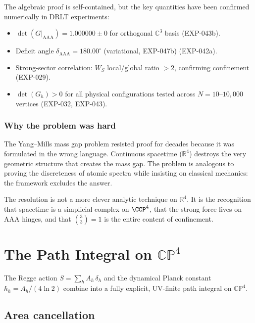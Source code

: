 \documentclass[12pt]{article}
\theoremstyle{remark}
\theoremstyle{definition}
\newcommand{\CC}{\mathbb{C}}
\newcommand{\RR}{\mathbb{R}}
\begin{document}
The algebraic proof is self-contained, but the key quantities have been
confirmed numerically in DRLT experiments:

\begin{itemize}
\item $\det(G|_{\mathrm{AAA}}) = 1.000000 \pm 0$ for orthogonal
  $\CC^3$ basis (EXP-043b).
\item Deficit angle $\delta_{\mathrm{AAA}} = 180.00^\circ$ (variational, EXP-047b)
  (EXP-042a).
\item Strong-sector correlation: $W_S$ local/global ratio $> 2$,
  confirming confinement (EXP-029).
\item $\det(G_h) > 0$ for all physical configurations tested across
  $N = 10$--$10{,}000$ vertices (EXP-032, EXP-043).
\end{itemize}

\subsubsection{Why the problem was hard}

The Yang--Mills mass gap problem resisted proof for decades because it
was formulated in the wrong language. Continuous spacetime
($\RR^4$) destroys the very geometric structure that creates the
mass gap. The problem is analogous to proving the discreteness of atomic
spectra while insisting on classical mechanics: the framework excludes
the answer.

The resolution is not a more clever analytic technique on $\RR^4$.
It is the recognition that spacetime is a simplicial complex on
$\CCP^4$, that the strong force lives on AAA hinges, and that
$\binom{3}{3} = 1$ is the entire content of confinement.

\section{The Path Integral on $\mathbb{CP}^4$}
\label{app:path_integral}

The Regge action $S = \sum_h A_h\,\delta_h$ and the dynamical Planck constant $\hbar_h = A_h/(4\ln 2)$ combine into a fully explicit, UV-finite path integral on $\mathbb{CP}^4$.

\subsection{Area cancellation}
\end{document}
